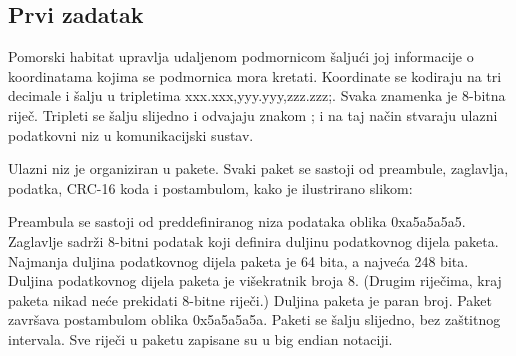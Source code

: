 \documentclass[a4paper]{article}
\begin{document}
\subsection{Prvi zadatak}
Pomorski habitat upravlja udaljenom podmornicom šaljući joj informacije o koordinatama kojima se podmornica mora kretati. Koordinate se kodiraju na tri decimale i šalju u tripletima xxx.xxx,yyy.yyy,zzz.zzz;. Svaka znamenka je 8-bitna riječ. Tripleti se šalju slijedno i odvajaju znakom ; i na taj način stvaraju ulazni podatkovni niz u komunikacijski sustav.

Ulazni niz je organiziran u pakete. Svaki paket se sastoji od preambule, zaglavlja, podatka, CRC-16 koda i postambulom, kako je ilustrirano slikom:


\begin{figure}[h!]
\centering
{}
\end{figure}

Preambula se sastoji od preddefiniranog niza podataka oblika 0xa5a5a5a5. Zaglavlje sadrži 8-bitni podatak koji definira duljinu podatkovnog dijela paketa. Najmanja duljina podatkovnog dijela paketa je 64 bita, a najveća 248 bita. Duljina podatkovnog dijela paketa je višekratnik broja 8. (Drugim riječima, kraj paketa nikad neće prekidati 8-bitne riječi.) Duljina paketa je paran broj. Paket završava postambulom oblika 0x5a5a5a5a. Paketi se šalju slijedno, bez zaštitnog intervala. Sve riječi u paketu zapisane su u big endian notaciji.
\end{document}
